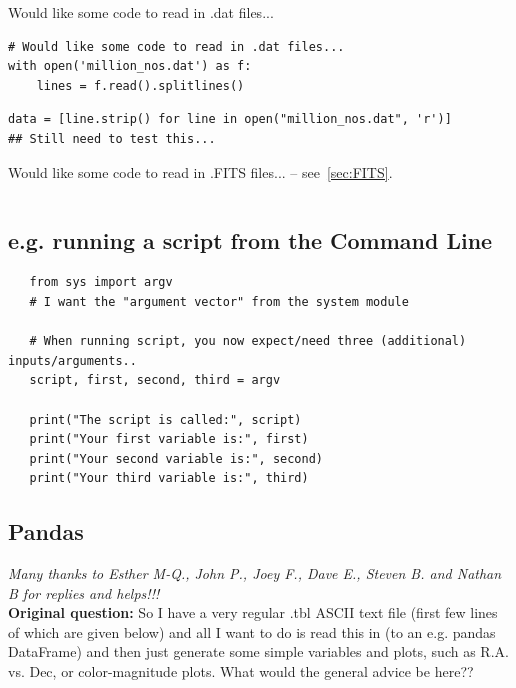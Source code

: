 \documentclass[11pt,a4paper]{article}
\begin{document}
Would like some code to read in .dat files...
\begin{lstlisting}
# Would like some code to read in .dat files...
with open('million_nos.dat') as f:
    lines = f.read().splitlines()
\end{lstlisting}

\begin{lstlisting}
data = [line.strip() for line in open("million_nos.dat", 'r')]
## Still need to test this...
\end{lstlisting}


\smallskip
\smallskip
\noindent 
Would like some code to read in .FITS files... -- see~\ref{sec:FITS}. 
\begin{lstlisting}
\end{lstlisting}


    \subsection{e.g. running a script from the Command Line}
    \begin{lstlisting}
   from sys import argv
   # I want the "argument vector" from the system module

   # When running script, you now expect/need three (additional) inputs/arguments..
   script, first, second, third = argv

   print("The script is called:", script)
   print("Your first variable is:", first)
   print("Your second variable is:", second)
   print("Your third variable is:", third)
   \end{lstlisting}


\newpage
    \subsection{Pandas}
    
    \smallskip
    \noindent
    {\it Many thanks to Esther M-Q., John P., Joey F., Dave E., Steven B. and Nathan B 
    for replies and helps!!!}\\

    \smallskip
    \noindent
    {\bf Original question:} So I have a very regular .tbl ASCII text
    file (first few lines of which are given below) and all I want to do
    is read this in (to an e.g. pandas DataFrame) and then just generate
    some simple variables and plots, such as R.A. vs. Dec, or
    color-magnitude plots. What would the general advice be here??\\
\end{document}
